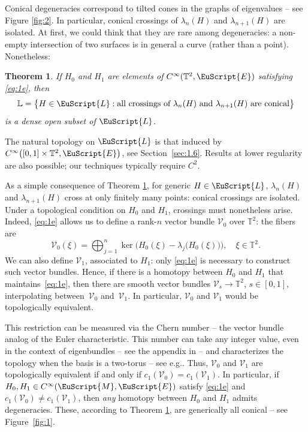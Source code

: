 \documentclass[10pt]{amsart}
\let\pazocal\EuScript
\let\sep:
\newtheorem{thm}{Theorem}
\theoremstyle{definition}
\newcommand{\EE}{\pazocal{E}}
\newcommand{\MM}{\pazocal{M}}
\newcommand{\LL}{{\pazocal{L}}}
\newcommand{\VVV}{{\mathscr{V}}}
\newcommand{\Ll}{\mathbb{L}}
\newcommand{\Tt}{{\mathbb{T}}}
\providecommand{\eg}{e.g.}\providecommand{\ie}{i.e.}\providecommand{\etc}{etc.}\providecommand{\resp}{resp.}\providecommand{\cf}{cf.}
\begin{document}
Conical degeneracies correspond to tilted cones in the graphs of eigenvalues -- see Figure \ref{fig:2}.
In particular, conical crossings of $\lambda_n(H)$ and $\lambda_{n+1}(H)$ are isolated. At first, we could think that they are rare among degeneracies: a non-empty intersection of two surfaces is in general a curve (rather than a point). Nonetheless:

\begin{thm}\label{thm:1} If $H_0$ and $H_1$ are elements of $C^\infty(\Tt^2,\EE)$ satisfying \eqref{eq:1e}, then
\begin{equation*}
\Ll = \bigl\{ H \in \LL \sep \text{all crossings of $\lambda_n(H)$ and $\lambda_{n+1}(H)$ are conical} \bigr\}
\end{equation*}
is a dense open subset of $\LL$.
\end{thm}

The natural topology on $\LL$ is that induced by $C^\infty\bigl([0,1] \times \Tt^2,\EE\bigr)$, see Section~\ref{sec:1.6}. Results at lower regularity are also possible; our techniques typically require $C^2$.

As a simple consequence of Theorem \ref{thm:1}, for generic $H \in \LL$, $\lambda_n(H)$ and $\lambda_{n+1}(H)$ cross at only finitely many points: conical crossings are isolated. Under a topological condition on $H_0$ and $H_1$, crossings must nonetheless arise. Indeed, \eqref{eq:1e} allows us to define a rank-$n$ vector bundle $\VVV_0$ over $\Tt^2$: the fibers are
\begin{equation*}
\VVV_0(\xi) =
\bigoplus_{j=1}^n \ker\bigl( H_0(\xi) - \lambda_j\bigl( H_0(\xi) \bigr) \bigr), \quad \xi \in \Tt^2.
\end{equation*}
We can also define $\VVV_1$, associated to $H_1$: only \eqref{eq:1e} is necessary to construct such vector bundles. Hence, if there is a homotopy between $H_0$ and $H_1$ that maintains~\eqref{eq:1e}, then there are smooth vector bundles $\VVV_s \to \Tt^2$, $s\in [0,1]$, interpolating between~$\VVV_0$ and~$\VVV_1$. In particular, $\VVV_0$ and $\VVV_1$ would be topologically equivalent.

This restriction can be measured via the Chern number -- the vector bundle analog of the Euler characteristic. This number can take any integer value, even in the context of eigenbundles -- see the appendix in \cite{D19c} -- and characterizes the topology when the basis is a two-torus -- see \eg \cite{P07,M17}. Thus, $\VVV_0$ and $\VVV_1$ are topologically equivalent if and only if $c_1(\VVV_0) = c_1(\VVV_1)$. In particular, if $H_0, H_1 \in C^\infty(\MM,\EE)$ satisfy \eqref{eq:1e} and $c_1(\VVV_0) \neq c_1(\VVV_1)$, then \textit{any} homotopy between $H_0$ and $H_1$ admits degeneracies. These, according to Theorem \ref{thm:1}, are generically all conical -- see Figure~\ref{fig:1}.
\end{document}
